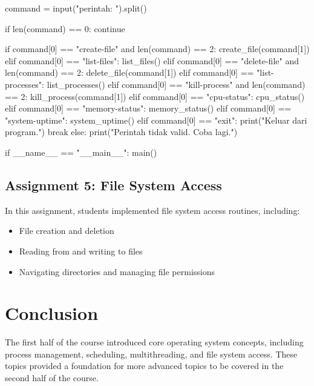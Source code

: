 \documentclass[12pt]{article}
\begin{document}
\begin{python}
        command = input("\nMasukkan perintah: ").split()

        if len(command) == 0:
            continue

        if command[0] == "create-file" and len(command) == 2:
            create_file(command[1])
        elif command[0] == "list-files":
            list_files()
        elif command[0] == "delete-file" and len(command) == 2:
            delete_file(command[1])
        elif command[0] == "list-processes":
            list_processes()
        elif command[0] == "kill-process" and len(command) == 2:
            kill_process(command[1])
        elif command[0] == "cpu-status":
            cpu_status()
        elif command[0] == "memory-status":
            memory_status()
        elif command[0] == "system-uptime":
            system_uptime()
        elif command[0] == "exit":
            print("Keluar dari program.")
            break
        else:
            print("Perintah tidak valid. Coba lagi.")

if __name__ == "__main__":
    main()

\end{python}

\subsection{Assignment 5: File System Access}
In this assignment, students implemented file system access routines, including:
\begin{itemize}
    \item File creation and deletion
    \item Reading from and writing to files
    \item Navigating directories and managing file permissions
\end{itemize}

\section{Conclusion}
The first half of the course introduced core operating system concepts, including process management, scheduling, multithreading, and file system access. These topics provided a foundation for more advanced topics to be covered in the second half of the course.
\end{document}
